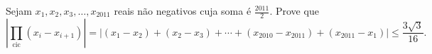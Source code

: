 Sejam $x_1, x_2, x_3, \dots, x_{2011}$ reais não negativos cuja soma é $\frac{2011}{2}$.
Prove que
$$\left | \prod_\mathrm{cic} (x_i - x_{i+1}) \right | =
\left | (x_1 - x_2) + (x_2 - x_3) + \cdots + (x_{2010} - x_{2011}) + (x_{2011} - x_1) \right | \le \frac{3\sqrt{3}}{16}.$$ 
